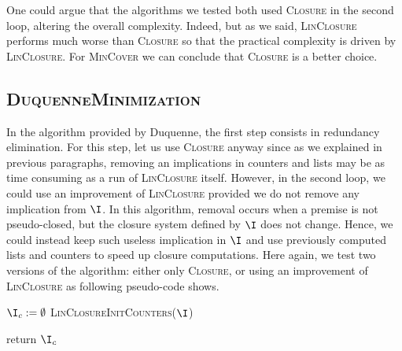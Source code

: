 \vspace{1.2em}

One could argue that the algorithms we tested both used \textsc{Closure} in the second loop, altering the overall complexity. Indeed, but as we said, \textsc{LinClosure} performs much worse than \textsc{Closure} so that the practical complexity is driven by \textsc{LinClosure}. For \textsc{MinCover}
we can conclude that \textsc{Closure} is a better choice.

\subsection{\textsc{DuquenneMinimization}}

In the algorithm provided by Duquenne, the first step consists in redundancy elimination. For this step, let us use \textsc{Closure} anyway since as we
explained in previous paragraphs, removing an implications in counters and
lists may be as time consuming as a run of \textsc{LinClosure} itself. However,
in the second loop, we could use an improvement of \textsc{LinClosure} provided
we do not remove any implication from $\I$. In this algorithm, removal occurs
when a premise is not pseudo-closed, but the closure system defined by $\I$
does not change. Hence, we could instead keep such useless implication in 
$\I$ and use previously computed lists and counters to speed up closure computations. Here again, we test two versions of the algorithm: either only
\textsc{Closure}, or using an improvement of \textsc{LinClosure} as following pseudo-code shows.

\vspace{1.2em}

\begin{algorithm}[H]
	
	\BlankLine
	\BlankLine
	
	$\I_c := \emptyset$ \;
	\textsc{LinClosureInitCounters}($\I$) \;
	
	
	return $\I_c$ \;

	\label{alg:DuquenneLin}
	
\end{algorithm}

